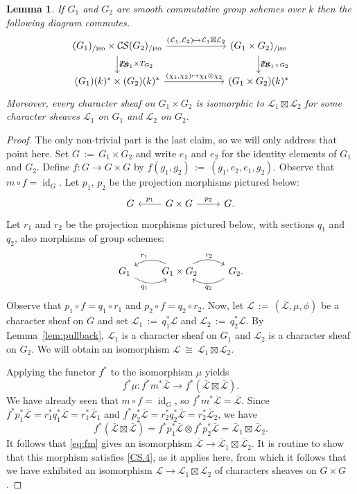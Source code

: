 \documentclass[10pt]{amsart}
\theoremstyle{plain}
\newtheorem{lemma}[theorem]{Lemma}
\theoremstyle{definition}
\theoremstyle{remark}
\newcommand{\Fq}{k}
\DeclareMathOperator{\id}{id}
\newcommand{\ceq}{{\, :=\, }}
\newcommand{\iso}{{\ \cong\ }}
\newcommand{\TrFrob}[1]{T_{#1}}
\newcommand{\cs}[1]{{\mathcal{#1}}}
\newcommand{\gcs}[1]{{\mathcal{\bar #1}}}
\newcommand{\CS}{{\mathcal{C\hskip-0.8pt S}}}
\newcommand{\CSiso}[1]{\CS(#1)_{/\text{iso}}}
\begin{document}
\begin{lemma}\label{lem:product}
If $G_1$ and $G_2$ are smooth commutative group schemes over $\Fq$ then the following diagram commutes.
\[
\begin{tikzcd}[column sep=60]
\arrow{d}{\TrFrob{G_1} \times \TrFrob{G_2}} \CSiso{G_1}\times \CSiso{G_2} \arrow{r}{(\cs{L}_1,\cs{L}_2)\mapsto \cs{L}_1\boxtimes \cs{L}_2}
& \arrow{d}{\TrFrob{G_1\times G_2}} \CSiso{G_1\times G_2}\\
(G_1)(\Fq)^*\times (G_2)(\Fq)^* \arrow{r}{(\chi_1,\chi_2)\mapsto \chi_1\otimes \chi_2}  & (G_1\times G_2)(\Fq)^*
\end{tikzcd}
\]
Moreover, every character sheaf on $G_1\times G_2$ is isomorphic to $\cs{L}_1\boxtimes\cs{L}_2$ for some character sheaves $\cs{L}_1$ on $G_1$ and $\cs{L}_2$ on $G_2$.
\end{lemma}
\begin{proof}
The only non-trivial part is the last claim, so we will only address that point here.
%
Set $G \ceq G_1\times G_2$
and write $e_1$ and $e_2$ for the identity elements of $G_1$ and $G_2$.
Define $f : G\to G\times G$ by $f(g_1,g_2) \ceq (g_1,e_2,e_1,g_2)$.
Observe that $m\circ f = \id_G$.
Let $p_1$, $p_2$ be the projection morphisms pictured below:
\[
\begin{tikzcd}
G & \arrow[swap]{l}{p_1} G\times G \arrow{r}{p_2} & G.
\end{tikzcd}
\]
Let $r_1$ and $r_2$ be the projection morphisms pictured below,
with sections $q_1$ and $q_2$, also morphisms of group schemes:
\[
\begin{tikzcd}
G_1  \arrow[swap, bend right]{r}{q_1} &
\arrow[swap, bend right]{l}{r_1} G_1\times G_2 \arrow[bend left]{r}{r_2} &
\arrow[bend left]{l}{q_2} G_2.
\end{tikzcd}
\]
Observe that $p_1\circ f = q_1 \circ r_1$ and $p_2 \circ f = q_2\circ r_2$.
%
Now, let $\cs{L} \ceq (\gcs{L},\mu,\phi)$ be a character sheaf on $G$
and set $\cs{L}_1 \ceq q_1^* \cs{L}$ and $\cs{L}_2 \ceq q_2^* \cs{L}$.
By Lemma~\ref{lem:pullback}, $\cs{L}_1$ is a character sheaf on $G_1$
and $\cs{L}_2$ is a character sheaf on $G_2$.
We will obtain an isomorphism $\cs{L} \iso  \cs{L}_1\boxtimes \cs{L}_2$.

Applying the functor $f^*$ to the isomorphism $\mu$ yields
\begin{equation}\label{eq:fm}
f^*\mu : f^* m^* \gcs{L} \to f^*(\gcs{L}\boxtimes \gcs{L}) .
\end{equation}
We have already seen that $m\circ f = \id_G$, so $f^* m^* \gcs{L} = \gcs{L}$.  
Since $f^*p_1^*\gcs{L} = r_1^* q_1^* \gcs{L} = r_1^* \gcs{L}_1$ and $f^*p_2^*\gcs{L} = r_2^* q_2^* \gcs{L} = r_2^*\gcs{L}_2$,
we have 
\[
f^*(\gcs{L}\boxtimes \gcs{L})  = f^*p_1^*\gcs{L}\otimes f^* p_2^*\gcs{L} = \gcs{L}_1\boxtimes \gcs{L}_2.
\]
It follows that \eqref{eq:fm} gives an isomorphism $\gcs{L} \to  \gcs{L}_1\boxtimes \gcs{L}_2$.
It is routine to show that this morphism satisfies
\ref{CS.4}, as it applies here,
from which it follows that we have exhibited an isomorphism
$\cs{L} \to \cs{L}_1\boxtimes \cs{L}_2$ of characters sheaves on $G\times G$.
\end{proof}
\end{document}

